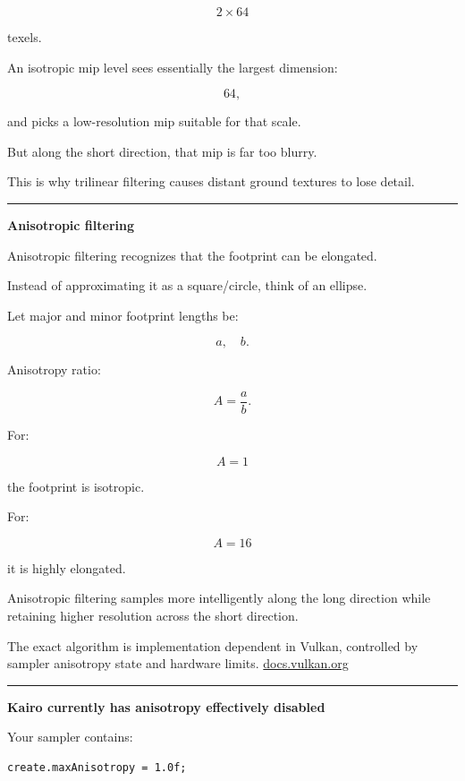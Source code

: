 \[
2\times64
\]

texels.

An isotropic mip level sees essentially the largest dimension:

\[
64,
\]

and picks a low-resolution mip suitable for that scale.

But along the short direction, that mip is far too blurry.

This is why trilinear filtering causes distant ground textures to lose detail.

\begin{center}\rule{0.5\linewidth}{0.5pt}\end{center}

\textbf{Anisotropic filtering}

Anisotropic filtering recognizes that the footprint can be elongated.

Instead of approximating it as a square/circle, think of an ellipse.

Let major and minor footprint lengths be:

\[
a,\quad b.
\]

Anisotropy ratio:

\[
\boxed{
A=\frac{a}{b}.
}
\]

For:

\[
A=1
\]

the footprint is isotropic.

For:

\[
A=16
\]

it is highly elongated.

Anisotropic filtering samples more intelligently along the long direction while retaining higher resolution across the short direction.

The exact algorithm is implementation dependent in Vulkan, controlled by sampler anisotropy state and hardware limits. \href{https://docs.vulkan.org/spec/latest/chapters/textures.html?utm_source=chatgpt.com}{docs.vulkan.org}

\begin{center}\rule{0.5\linewidth}{0.5pt}\end{center}

\textbf{Kairo currently has anisotropy effectively disabled}

Your sampler contains:

\begin{verbatim}
create.maxAnisotropy = 1.0f;
\end{verbatim}

